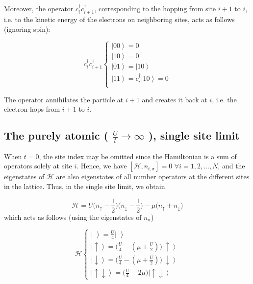 Moreover, the operator $c_i^\dagger c_{i+1}^\dagger$, corresponding to the hopping from site $i+1$ to $i$, i.e. to the kinetic energy of the electrons on neighboring sites, acts as follows (ignoring spin):

\begin{equation}
c_i^\dagger c_{i+1}^\dagger \begin{cases}
\left|0 0 \right\rangle = 0 \\
\left|1 0 \right\rangle =  0 \\
\left|0 1 \right\rangle =  \left| 1 0 \right\rangle \\
\left|1 1 \right\rangle =  c_i^\dagger \left| 1 0  \right\rangle = 0 \\
\end{cases}
\end{equation}

The operator annihilates the particle at $i+1$ and creates it back at $i$, i.e. the electron hops from $i+1$ to $i$.

\subsection{The purely atomic ( $\frac{U}{t} \rightarrow \infty$ ), single site limit}
\label{subsec:atomic}

When $t = 0$, the site index may be omitted since the Hamiltonian is a sum of operators solely at site $i$.
Hence, we have $[ \mathcal{H}, n_{i,\sigma} ] = 0 \,\, \forall i = 1, 2,..., N $, and the eigenstates of $\mathcal{H}$ are also eigenstates of all number operators at the different sites in the lattice.
Thus, in the single site limit, we obtain

\begin{equation}
\mathcal{H} = U \bigg(n_\uparrow - \frac{1}{2} \bigg) \bigg(n_\downarrow - \frac{1}{2} \bigg) - \mu \bigg( n_\uparrow + n_\downarrow \bigg)
\end{equation}
which acts as follows (using the eigenstates of $n_\sigma$)

\begin{equation}
\mathcal{H} \begin{cases}
\left| \,\, \right\rangle = \frac{U}{4} \left| \,\, \right\rangle \\
\left| \uparrow \right\rangle = \bigg( \frac{U}{4} - (\mu + \frac{U}{2} ) \bigg) \left| \uparrow \right\rangle \\
\left| \downarrow \right\rangle = \bigg( \frac{U}{4} - (\mu + \frac{U}{2} ) \bigg) \left| \downarrow \right\rangle \\
\left| \uparrow \downarrow \right\rangle = \bigg( \frac{U}{4} - 2 \mu \bigg) \left| \uparrow \downarrow \right\rangle
\end{cases}
\end{equation}

